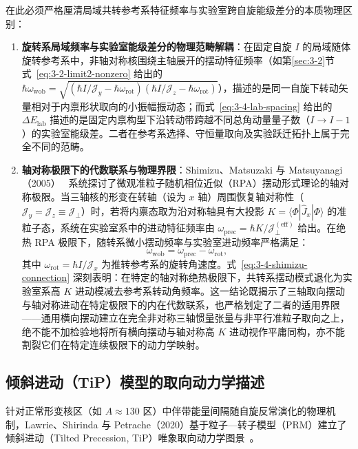 在此必须严格厘清局域共转参考系特征频率与实验室跨自旋能级差分的本质物理区别：
\begin{enumerate}
\item \textbf{旋转系局域频率与实验室能级差分的物理范畴解耦}：在固定自旋 $I$ 的局域随体旋转参考系中，非轴对称核围绕主轴展开的摆动特征频率（如第\ref{sec:3-2}节式~\eqref{eq:3-2-limit2-nonzero} 给出的 $\hbar \omega_{\text{wob}} = \sqrt{(\hbar I/\mathcal{J}_y - \hbar\omega_{\text{rot}})(\hbar I/\mathcal{J}_z - \hbar\omega_{\text{rot}})}$），描述的是同一自旋下转动矢量相对于内禀形状取向的小振幅振动态；而式~\eqref{eq:3-4-lab-spacing} 给出的 $\Delta E_{\text{lab}}$ 描述的是固定内禀构型下沿转动带跨越不同总角动量量子数（$I \to I-1$）的实验室能级差。二者在参考系选择、守恒量取向及实验跃迁拓扑上属于完全不同的范畴。
\item \textbf{轴对称极限下的代数联系与物理界限}：Shimizu、Matsuzaki 与 Matsuyanagi（2005）~\cite{shimizu-2005-high-k-precession} 系统探讨了微观准粒子随机相位近似（RPA）摆动形式理论的轴对称极限。当三轴核的形变在转轴（设为 $x$ 轴）周围恢复轴对称性（$\mathcal{J}_y = \mathcal{J}_z \equiv \mathcal{J}_\perp$）时，若将内禀态取为沿对称轴具有大投影 $K = \langle \Phi | \hat{J}_x | \Phi \rangle$ 的准粒子态，系统在实验室系中的进动特征频率由 $\omega_{\text{prec}} = \hbar K/\mathcal{J}_\perp^{(\text{eff})}$ 给出。在绝热 RPA 极限下，随转系微小摆动频率与实验室进动频率严格满足：
\begin{equation}\label{eq:3-4-shimizu-connection}
\omega_{\text{wob}} = \omega_{\text{prec}} - \omega_{\text{rot}},
\end{equation}
其中 $\omega_{\text{rot}} = \hbar I/\mathcal{J}_x$ 为推转参考系的旋转角速度。式~\eqref{eq:3-4-shimizu-connection} 深刻表明：在特定的轴对称绝热极限下，共转系摆动模式退化为实验室系高 $K$ 进动模减去参考系转动角频率。这一结论既揭示了三轴取向摆动与轴对称进动在特定极限下的内在代数联系，也严格划定了二者的适用界限——通用横向摆动建立在完全非对称三轴惯量张量与非平行准粒子取向之上，绝不能不加检验地将所有横向摆动与轴对称高 $K$ 进动视作平庸同构，亦不能割裂它们在特定连续极限下的动力学映射。
\end{enumerate}

\subsection{倾斜进动（TiP）模型的取向动力学描述}\label{sec:3-4-2}

针对正常形变核区（如 $A \approx 130$ 区）中伴带能量间隔随自旋反常演化的物理机制，Lawrie、Shirinda 与 Petrache（2020）基于粒子—转子模型（PRM）建立了倾斜进动（Tilted Precession, TiP）唯象取向动力学图景~\cite{lawrie-2020-tilted-precession-wobbling}。

